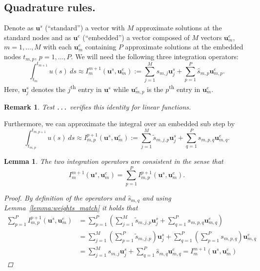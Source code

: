 \documentclass{article}
\newtheorem{remark}{Remark}
\newtheorem{lemma}{Lemma}
\newcommand{\ve}[1]{\mathbf{#1}}
\begin{document}
\subsection*{Quadrature rules.}
Denote as $\ve{u}^{s}$ (``standard'') a vector with $M$ approximate solutions at the standard nodes and as $\ve{u}^{e}$ (``embedded'') a vector composed of $M$ vectors $\ve{u}^{e}_{m}$, $m=1,\ldots,M$ with each $\ve{u}^{e}_{m}$ containing $P$ approximate solutions at the embedded nodes $t_{m,p}$, $p=1, \ldots, P$.
We will need the following three integration operators:
\begin{equation}
	\int_{t_{m}}^{t_{m+1}} u(s)~ds \approx I_{m}^{m+1}(\ve{u}^s, \ve{u}^{e}_{m}) := \sum_{j=1}^{M} s_{m,j} \ve{u}^{s}_{j} + \sum_{p=1}^{P} \hat{s}_{m,p} \ve{u}^{e}_{m,p}.
\end{equation}
Here, $\ve{u}^{s}_{j}$ denotes the $j$\textsuperscript{th} entry in $\ve{u}^{s}$ while $\ve{u}^{e}_{m,p}$ is the $p$\textsuperscript{th} entry in $\ve{u}^{e}_{m}$.
\begin{remark}
Test \texttt{...} verifies this identity for linear functions.
\end{remark}
Furthermore, we can approximate the integral over an embedded sub step by
\begin{equation}
	\int_{t_{m,p}}^{t_{m,p+1}} u(s)~ds \approx I_{m,p}^{p+1}(\ve{u}^s, \ve{u}^{e}_{m}) := \sum_{j=1}^{M} \tilde{s}_{m,j,p} \ve{u}^{s}_{j} + \sum_{q=1}^{P} s_{m,p,q} \ve{u}^{e}_{m,q}.
\end{equation}
\begin{lemma}\label{lemma:quadrature_match}
The two integration operators are consistent in the sense that
\begin{equation}
	I_{m}^{m+1}(\ve{u}^s, \ve{u}^{e}_{m}) = \sum_{p=1}^{P} I_{m,p}^{p+1}(\ve{u}^s, \ve{u}^{e}_{m}).
\end{equation}
\begin{proof}
By definition of the operators and $\hat{s}_{m,q}$ and using Lemma~\ref{lemma:weights_match} it holds that
\begin{align*}
	\sum_{p=1}^{P} I_{m,p}^{p+1}(\ve{u}^s, \ve{u}^{e}_{m}) &= \sum_{p=1}^{P} \left( \sum_{j=1}^{M} \tilde{s}_{m,j,p} \ve{u}^{s}_j + \sum_{q=1}^{P} s_{m,p,q} \ve{u}^{e}_{m,q} \right) \\
		&= \sum_{j=1}^{M} \left( \sum_{p=1}^{P} \tilde{s}_{m,j,p} \right) \ve{u}^{s}_{j} + \sum_{q=1}^{P} \left( \sum_{p=1}^{P} s_{m,p,q} \right) \ve{u}^{e}_{m,q} \\
		&= \sum_{j=1}^{M} s_{m,j} \ve{u}^{s}_{j} + \sum_{q=1}^{P} \hat{s}_{m,q} \ve{u}^{e}_{m,q} = I_{m}^{m+1}(\ve{u}^s, \ve{u}^{e}_{m})
\end{align*}
\end{proof}
\end{lemma}
\end{document}
